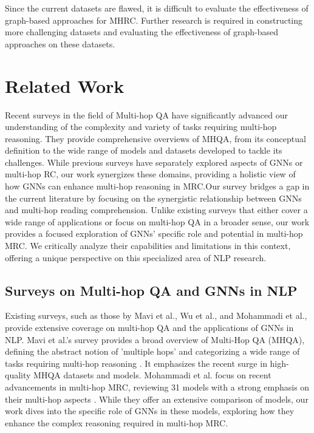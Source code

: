 \documentclass[sigplan,screen,nonacm]{acmart}
\begin{document}
Since the current datasets are flawed, it is difficult to evaluate the effectiveness of graph-based approaches for MHRC. Further research is 
required in constructing more challenging datasets and evaluating the effectiveness of graph-based approaches on these datasets.



\section{Related Work}
Recent surveys in the field of Multi-hop QA have significantly advanced our understanding of the complexity and variety of tasks requiring multi-hop reasoning. 
They provide comprehensive overviews of MHQA, from its conceptual definition to the wide range of models and datasets developed to tackle its challenges. 
While previous surveys have separately explored aspects of GNNs or multi-hop RC, our work synergizes these domains, providing a holistic view 
of how GNNs can enhance multi-hop reasoning in MRC.Our survey bridges a gap in the current literature by focusing on the synergistic relationship 
between GNNs and multi-hop reading comprehension. Unlike existing surveys that either cover a wide range of applications or focus on multi-hop QA 
in a broader sense, our work provides a focused exploration of GNNs' specific role and potential in multi-hop MRC. We critically analyze their
capabilities and limitations in this context, offering a unique perspective on this specialized area of NLP research. 

\subsection{Surveys on Multi-hop QA and GNNs in NLP}
Existing surveys, such as those by Mavi et al., Wu et al., and Mohammadi et al., provide extensive coverage on multi-hop QA and the applications 
of GNNs in NLP. Mavi et al.'s survey provides a broad overview of Multi-Hop QA (MHQA), defining the abstract notion of 'multiple hops' and categorizing 
a wide range of tasks requiring multi-hop reasoning \cite{RN165}. It emphasizes the recent surge in high-quality MHQA datasets and models. 
Mohammadi et al. focus on recent advancements in multi-hop MRC, reviewing 31 models with a strong emphasis on their multi-hop aspects \cite{RN80}. 
While they offer an extensive comparison of models, our work dives into the specific role of GNNs in these models, exploring how they enhance 
the complex reasoning required in multi-hop MRC.
\end{document}
